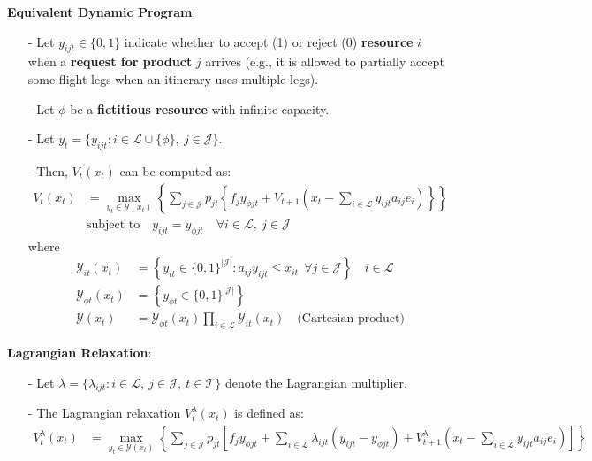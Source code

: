 \documentclass[11pt]{article}
\begin{document}
\vspace{0.5cm}

\noindent
\textbf{Equivalent Dynamic Program}:
\begin{itemize}[itemsep=0pt,parsep=0pt]
\item[-] Let $y_{ijt}\in\{0,1\}$ indicate whether to accept (1) or reject (0) \textbf{resource} $i$ when a \textbf{request for product} $j$ arrives (e.g., it is allowed to partially accept some flight legs when an itinerary uses multiple legs).
\item[-] Let $\phi$ be a \textbf{fictitious resource} with infinite capacity. 
\item[-] Let $y_t = \{y_{ijt} : i \in \mathcal{L} \cup \{\phi\}, \ j \in \mathcal{J}\}$.
\item[-] Then, $V_t(x_t)$ can be computed as:
    \begin{align*}
        V_t(x_t) &= \max_{y_t \in \mathcal{Y}(x_t)}
            \left\{ \sum_{j\in \mathcal{J}} p_{jt} 
            \left\{ 
                f_j y_{\phi jt} + 
                V_{t+1} \left(x_t - \sum_{i\in \mathcal{L}}y_{ijt}a_{ij}e_i\right) 
            \right\} \right\}
        \tag{DP2} \\
        & \text{subject to} \quad y_{ijt} = y_{\phi jt} \quad \forall i \in \mathcal{L}, \ j \in \mathcal{J}
    \end{align*}
    where
    \begin{align*}
        \mathcal{Y}_{it}(x_t) &= \left\{ 
            y_{it} \in \{0,1\}^{|\mathcal{J}|} : 
            a_{ij} y_{ijt} \leq x_{it} \ \ 
            \forall j \in \mathcal{J} 
        \right\} \quad i \in \mathcal{L} \\
        \mathcal{Y}_{\phi t}(x_t) &= \left\{ 
            y_{\phi t} \in \{0,1\}^{|\mathcal{J}|} 
        \right\} \\
        \mathcal{Y}(x_t) &= \mathcal{Y}_{\phi t}(x_t) \prod_{i \in \mathcal{L}} \mathcal{Y}_{it}(x_t) \quad \text{(Cartesian product)}
    \end{align*}
\end{itemize}

\vspace{0.5cm}

\noindent
\textbf{Lagrangian Relaxation}:
\begin{itemize}[itemsep=0pt,parsep=0pt]
\item[-] Let $\lambda = \{\lambda_{ijt} : i \in \mathcal{L}, \ j \in \mathcal{J}, \ t \in \mathcal{T}\}$ denote the Lagrangian multiplier. 
\item[-] The Lagrangian relaxation $V^{\lambda}_t(x_t)$ is defined as:
    {\small
    \begin{align*}
        V^{\lambda}_t(x_t) &= \max_{y_t \in \mathcal{Y}(x_t)} 
            \left\{ \sum_{j\in \mathcal{J}} p_{jt} 
            \left[ 
                f_j y_{\phi jt} +
                \sum_{i \in \mathcal{L}} \lambda_{ijt} (y_{ijt} - y_{\phi jt}) + 
                V^{\lambda}_{t+1} \left(x_t - \sum_{i\in \mathcal{L}}y_{ijt}a_{ij}e_i\right) 
            \right] \right\}
            \tag{LR} 
    \end{align*}
    }%
\end{itemize}
\end{document}
